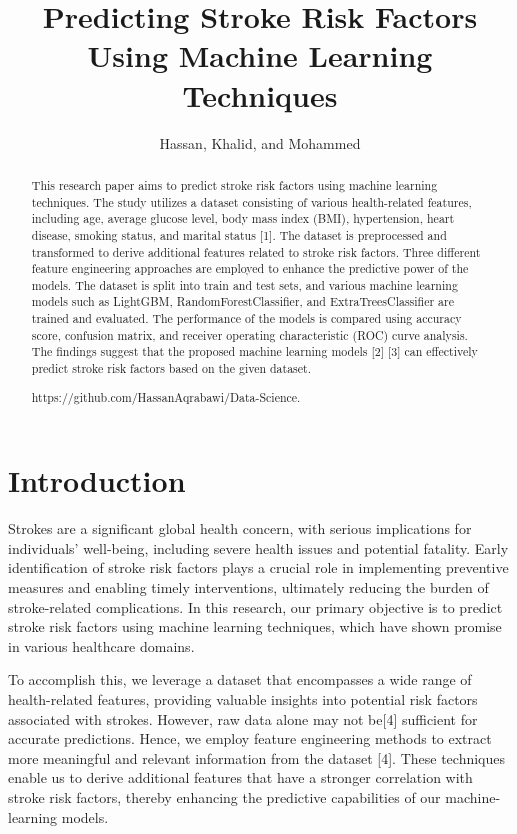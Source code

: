 \documentclass{article}
\title{Predicting Stroke Risk Factors Using Machine Learning Techniques}
\author{Hassan, Khalid, and Mohammed}
\begin{document}
\maketitle

\begin{abstract}
This research paper aims to predict stroke risk factors using machine learning techniques. The study utilizes a dataset consisting of various health-related features, including age, average glucose level, body mass index (BMI), hypertension, heart disease, smoking status, and marital status [1]. The dataset is preprocessed and transformed to derive additional features related to stroke risk factors. Three different feature engineering approaches are employed to enhance the predictive power of the models. The dataset is split into train and test sets, and various machine learning models such as LightGBM, RandomForestClassifier, and ExtraTreesClassifier are trained and evaluated. The performance of the models is compared using accuracy score, confusion matrix, and receiver operating characteristic (ROC) curve analysis. The findings suggest that the proposed machine learning models [2] [3] can effectively predict stroke risk factors based on the given dataset.

https://github.com/HassanAqrabawi/Data-Science.

\end{abstract}

\section{Introduction}

Strokes are a significant global health concern, with serious implications for individuals' well-being, including severe health issues and potential fatality. Early identification of stroke risk factors plays a crucial role in implementing preventive measures and enabling timely interventions, ultimately reducing the burden of stroke-related complications. In this research, our primary objective is to predict stroke risk factors using machine learning techniques, which have shown promise in various healthcare domains.

To accomplish this, we leverage a dataset that encompasses a wide range of health-related features, providing valuable insights into potential risk factors associated with strokes. However, raw data alone may not be[4] sufficient for accurate predictions. Hence, we employ feature engineering methods to extract more meaningful and relevant information from the dataset [4]. These techniques enable us to derive additional features that have a stronger correlation with stroke risk factors, thereby enhancing the predictive capabilities of our machine-learning models.
\end{document}
